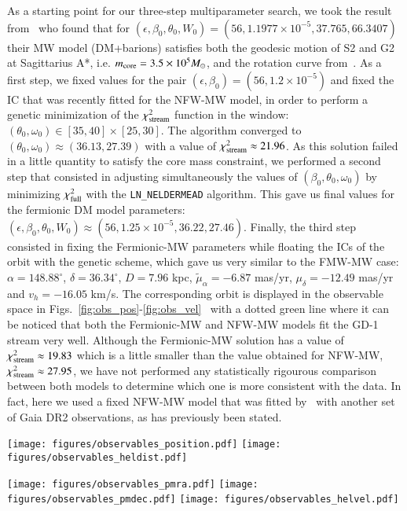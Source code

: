 \documentclass[twocolumn]{aa}
\begin{document}
As a starting point for our three-step multiparameter search, we took the result from~\citet{2020A&A...641A..34B} who found that for $(\epsilon, \beta_0, \theta_0, W_0)=(56, 1.1977\times10^{-5}, 37.765, 66.3407)$
their MW model (DM+barions) satisfies both the geodesic motion of S2 and G2 at Sagittarius A*, i.e. $m_{\rm core}=3.5\times 10^5 M_\odot$, and the rotation curve from~\citet{sofue_rotation_2013}.
As a first step, we fixed values for the pair $(\epsilon,\beta_0)=(56,1.2\times10^{-5})$ and
fixed the IC that was recently fitted for the NFW-MW model, in order to perform a genetic minimization of the
$\chi^2_{\rm{stream}}$ function in the window:
$(\theta_0,\omega_0)\in [35, 40]\times[25, 30]$. The algorithm converged to
$(\theta_0, \omega_0)\approx (36.13, 27.39)$ with a value of $\chi^2_{\rm{stream}}\approx 21.96$. As this solution failed in a little quantity to satisfy
the core mass constraint, we performed a second step that consisted in adjusting simultaneously
the values of $(\beta_0,\theta_0,\omega_0)$ by minimizing $\chi^2_{\rm{full}}$ with the
\texttt{LN\_NELDERMEAD} algorithm. This gave us final values for the fermionic DM model parameters:
$(\epsilon, \beta_0, \theta_0, W_0)\approx(56, 1.25\times10^{-5}, 36.22, 27.46)$.
Finally, the third step consisted in fixing the Fermionic-MW parameters while floating the ICs of the orbit with the genetic scheme, which gave us very similar to the FMW-MW case:
$\alpha=148.88^{\circ}$, $\delta=36.34^{\circ}$, $D=7.96$ kpc,
$\tilde{\mu}_\alpha=-6.87$ mas/yr, $\mu_\delta=-12.49$ mas/yr and $v_h=-16.05$ km/s.
The corresponding orbit is displayed in the observable space in Figs.~\ref{fig:obs_pos}-\ref{fig:obs_vel}~
with a dotted green line where it can be noticed that both the Fermionic-MW and NFW-MW models
fit the GD-1 stream very well.
Although the Fermionic-MW solution has a value of $\chi^2_{\rm{stream}}\approx 19.83$
which is a little smaller than the value obtained for NFW-MW, $\chi^2_{\rm{stream}}\approx 27.95$,
we have not performed any statistically rigourous comparison between both models to determine which one is
more consistent with the data. In fact, here we used a fixed NFW-MW model that was fitted by~\citet{2019MNRAS.486.2995M} with another set of Gaia DR2 observations, as has previously been stated.


\begin{figure*}
   \centering
   \texttt{[image: figures/observables\_position.pdf]}
   \texttt{[image: figures/observables\_heldist.pdf]}
   \caption{Stream fits in observable space: sky position (top: $\phi_2$) and heliocentric distance (bottom: $D$).}
   \label{fig:obs_pos}
\end{figure*}
\begin{figure*}
   \texttt{[image: figures/observables\_pmra.pdf]}
   \texttt{[image: figures/observables\_pmdec.pdf]}
   \texttt{[image: figures/observables\_helvel.pdf]}
   \caption{Stream fits in observable space: proper motion (top: $\tilde{\mu}_\alpha$, middle: $\mu_\delta$) and heliocentric velocity (bottom: $v_h$).}
   \label{fig:obs_vel}
\end{figure*}
\end{document}
